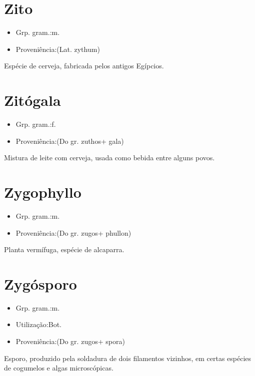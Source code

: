 \section{Zito}
\begin{itemize}
\item {Grp. gram.:m.}
\end{itemize}
\begin{itemize}
\item {Proveniência:(Lat. \textunderscore zythum\textunderscore )}
\end{itemize}
Espécie de cerveja, fabricada pelos antigos Egípcios.
\section{Zitógala}
\begin{itemize}
\item {Grp. gram.:f.}
\end{itemize}
\begin{itemize}
\item {Proveniência:(Do gr. \textunderscore zuthos\textunderscore  + \textunderscore gala\textunderscore )}
\end{itemize}
Mistura de leite com cerveja, usada como bebida entre alguns povos.
\section{Zygophyllo}
\begin{itemize}
\item {Grp. gram.:m.}
\end{itemize}
\begin{itemize}
\item {Proveniência:(Do gr. \textunderscore zugos\textunderscore  + \textunderscore phullon\textunderscore )}
\end{itemize}
Planta vermífuga, espécie de alcaparra.
\section{Zygósporo}
\begin{itemize}
\item {Grp. gram.:m.}
\end{itemize}
\begin{itemize}
\item {Utilização:Bot.}
\end{itemize}
\begin{itemize}
\item {Proveniência:(Do gr. \textunderscore zugos\textunderscore  + \textunderscore spora\textunderscore )}
\end{itemize}
Esporo, produzido pela soldadura de dois filamentos vizinhos, em certas espécies de cogumelos e algas microscópicas.
